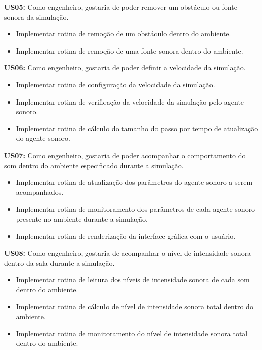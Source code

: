 \textbf{US05:} Como engenheiro, gostaria de poder remover um obstáculo ou fonte sonora da simulação.

\begin{itemize}
\item Implementar rotina de remoção de um obstáculo dentro do ambiente.
\item Implementar rotina de remoção de uma fonte sonora dentro do ambiente.
\end{itemize}
	
\textbf{US06:} Como engenheiro, gostaria de poder definir a velocidade da simulação.

\begin{itemize}
\item Implementar rotina de configuração da velocidade da simulação.
\item Implementar rotina de verificação da velocidade da simulação pelo agente sonoro.
\item Implementar rotina de cálculo do tamanho do passo por tempo de atualização do agente sonoro.
\end{itemize}
	
\textbf{US07:} Como engenheiro, gostaria de poder acompanhar o comportamento do som dentro do ambiente especificado durante a simulação.

\begin{itemize}
\item Implementar rotina de atualização dos parâmetros do agente sonoro a serem acompanhados.
\item Implementar rotina de monitoramento dos parâmetros de cada agente sonoro presente no ambiente durante a simulação.
\item Implementar rotina de renderização da interface gráfica com o usuário.
\end{itemize}
	
\textbf{US08:} Como engenheiro, gostaria de acompanhar o nível de intensidade sonora dentro da sala durante a simulação.

\begin{itemize}
\item Implementar rotina de leitura dos níveis de intensidade sonora de cada som dentro do ambiente.
\item Implementar rotina de cálculo de nível de intensidade sonora total dentro do ambiente.
\item Implementar rotina de monitoramento do nível de intensidade sonora total dentro do ambiente.
\end{itemize}
	
